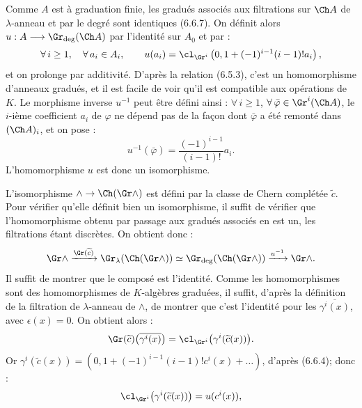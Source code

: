 

Comme \(A\) est à graduation finie, les gradués associés aux filtrations sur \(\Ch A\) de \(\lambda\)-anneau et par le degré sont identiques (6.6.7). On définit alors \(u:A\longrightarrow \Gr_{\deg}(\Ch A)\) par l'identité sur \(A_0\) et par :
\[
  \forall\, i\ge1,\quad\forall\, a_i\in A_i,\qquad u(a_i)=\cl_{\Gr^i}\left(0,1+(-1)^{i-1}(i-1)!a_i\right),
\]
et on prolonge par additivité. D'après la relation (6.5.3), c'est un homomorphisme d'anneaux gradués, et il est facile de voir qu'il est compatible aux opérations de \(K\). Le morphisme inverse \(u^{-1}\) peut être défini ainsi : \(\forall\, i\ge1\), \(\forall\,\bar\varphi\in\Gr^i(\Ch A)\), le \(i\)-ième coefficient \(a_i\) de \(\varphi\) ne dépend pas de la façon dont \(\bar\varphi\) a été remonté dans \((\Ch A)_i\), et on pose :
\[
  u^{-1}(\bar\varphi)=\frac{(-1)^{i-1}}{(i-1)!}a_i.
\]
L'homomorphisme \(u\) est donc un isomorphisme.

L'isomorphisme \(\mathord{\wedge}\to\Ch(\Gr\mathord{\wedge})\) est défini par la classe de Chern complétée \(\widetilde c\). Pour vérifier qu'elle définit bien un isomorphisme, il suffit de vérifier que l'homomorphisme obtenu par passage aux gradués associés en est un, les filtrations étant discrètes. On obtient donc :
\[
  \Gr\mathord{\wedge}
   \xrightarrow{\Gr(\widetilde c)}
  \Gr_{\lambda}(\Ch(\Gr\mathord{\wedge}))
   \simeq
  \Gr_{\deg}(\Ch(\Gr\mathord{\wedge}))
   \xrightarrow{u^{-1}}
  \Gr\mathord{\wedge} .
\]
Il suffit de montrer que le composé est l'identité. Comme les homomorphismes sont des homomorphismes de \(K\)-algèbres graduées, il suffit, d'après la définition de la filtration de \(\lambda\)-anneau de \(\mathord{\wedge}\), de montrer que c'est l'identité pour les \(\overline{\gamma^i(x)}\), avec \(\epsilon(x)=0\). On obtient alors :
\[
  \Gr(\widetilde c)\bigl(\overline{\gamma^i(x)}\bigr)
  =
  \cl_{\Gr^i}\bigl(\gamma^i(\widetilde c(x))\bigr).
\]
Or \(\gamma^i(\widetilde c(x))=(0,1+(-1)^{i-1}(i-1)!c^i(x)+\ldots)\), d'après (6.6.4); donc :
\[
  \cl_{\Gr^i}\bigl(\gamma^i(\widetilde c(x))\bigr)=u(c^i(x)),
\]
